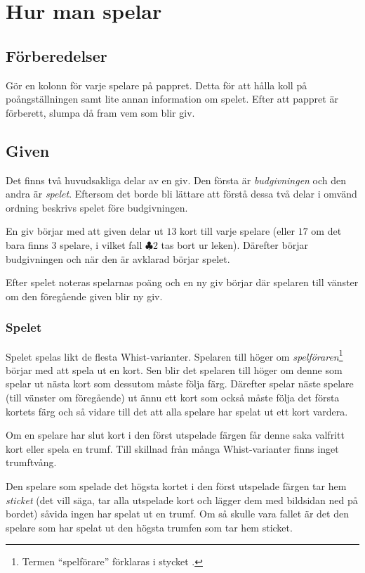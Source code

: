 \documentclass[a4paper]{article}
\begin{document}
	\section{Hur man spelar}{%
		\subsection{Förberedelser}{%
			Gör en kolonn för varje spelare på pappret. Detta för att hålla koll på poångställningen samt lite annan information om spelet. Efter att pappret är förberett, slumpa då fram vem som blir giv.
		}

		\subsection{Given}{%
			Det finns två huvudsakliga delar av en giv. Den första är \emph{budgivningen} och den andra är \emph{spelet}. Eftersom det borde bli lättare att förstå dessa två delar i omvänd ordning beskrivs spelet före budgivningen.

			En giv börjar med att given delar ut $13$ kort till varje spelare (eller $17$ om det bara finns $3$ spelare, i vilket fall $\clubsuit 2$ tas bort ur leken). Därefter börjar budgivningen och när den är avklarad börjar spelet.

			Efter spelet noteras spelarnas poäng och en ny giv börjar där spelaren till vänster om den föregående given blir ny giv.

			\subsubsection{Spelet}{%
				Spelet spelas likt de flesta Whist-varianter. Spelaren till höger om \emph{spelföraren}\footnote{Termen ``spelförare'' förklaras i stycket \textit{}.} börjar med att spela ut en kort. Sen blir det spelaren till höger om denne som spelar ut nästa kort som dessutom måste följa färg. Därefter spelar näste spelare (till vänster om föregående) ut ännu ett kort som också måste följa det första kortets färg och så vidare till det att alla spelare har spelat ut ett kort vardera.

				Om en spelare har slut kort i den först utspelade färgen får denne saka valfritt kort eller spela en trumf. Till skillnad från många Whist-varianter finns inget trumftvång.

				Den spelare som spelade det högsta kortet i den först utspelade färgen tar hem \emph{sticket} (det vill säga, tar alla utspelade kort och lägger dem med bildsidan ned på bordet) såvida ingen har spelat ut en trumf. Om så skulle vara fallet är det den spelare som har spelat ut den högsta trumfen som tar hem sticket.

}}}
\end{document}
